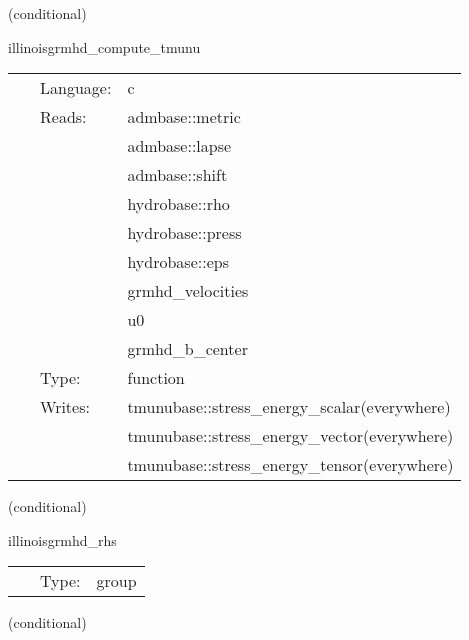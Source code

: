 \documentclass{article}
\begin{document}
\vspace{5mm}

   (conditional) 

\hspace{5mm} illinoisgrmhd\_compute\_tmunu 

\hspace{5mm}{\it compute stress-energy tensor } 


\hspace{5mm}

 \begin{tabular*}{160mm}{cll} 
~ & Language:  & c \\ 
~ & Reads:  & admbase::metric \\ 
~& ~ &admbase::lapse\\ 
~& ~ &admbase::shift\\ 
~& ~ &hydrobase::rho\\ 
~& ~ &hydrobase::press\\ 
~& ~ &hydrobase::eps\\ 
~& ~ &grmhd\_velocities\\ 
~& ~ &u0\\ 
~& ~ &grmhd\_b\_center\\ 
~ & Type:  & function \\ 
~ & Writes:  & tmunubase::stress\_energy\_scalar(everywhere) \\ 
~& ~ &tmunubase::stress\_energy\_vector(everywhere)\\ 
~& ~ &tmunubase::stress\_energy\_tensor(everywhere)\\ 
\end{tabular*} 


\vspace{5mm}

   (conditional) 

\hspace{5mm} illinoisgrmhd\_rhs 

\hspace{5mm}{\it evaluate rhss grhd equations } 


\hspace{5mm}

 \begin{tabular*}{160mm}{cll} 
~ & Type:  & group \\ 
\end{tabular*} 


\vspace{5mm}

   (conditional) 
\end{document}
